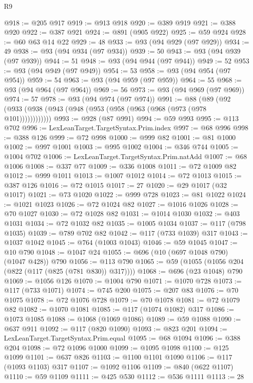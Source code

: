\begin{lexlean}{R9}
\begin{coremodule}
@918 := @205 @917
@919 := @913 @918
@920 := @389 @919
@921 := @388 @920
@922 := @387 @921
@924 := @891 (@905 @922)
@925 := @59 @924
@928 := @60 @63 @14 @22
@929 := 48
@933 := @93 (@94 @929 (@97 @929))
@934 := 49
@938 := @93 (@94 @934 (@97 @934))
@939 := 50
@943 := @93 (@94 @939 (@97 @939))
@944 := 51
@948 := @93 (@94 @944 (@97 @944))
@949 := 52
@953 := @93 (@94 @949 (@97 @949))
@954 := 53
@958 := @93 (@94 @954 (@97 @954))
@959 := 54
@963 := @93 (@94 @959 (@97 @959))
@964 := 55
@968 := @93 (@94 @964 (@97 @964))
@969 := 56
@973 := @93 (@94 @969 (@97 @969))
@974 := 57
@978 := @93 (@94 @974 (@97 @974))
@991 := @88 (@89 (@92 (@933 (@938 (@943 (@948 (@953 (@958 (@963 (@968 (@973 (@978 @101))))))))))))
@993 := @928 (@87 @991)
@994 := @59 @993
@995 := @113 @702
@996 := LexLeanTarget.TargetSyntax.Prim.index
@997 := @68 @996
@998 := @388 @126
@999 := @72 @998
@1000 := @999 @82
@1001 := @81 @1000
@1002 := @997 @1001
@1003 := @995 @1002
@1004 := @346 @744
@1005 := @1004 @702
@1006 := LexLeanTarget.TargetSyntax.Prim.natAdd
@1007 := @68 @1006
@1008 := @337 @77
@1009 := @336 @1008
@1011 := @72 @1009 @82
@1012 := @999 @1011
@1013 := @1007 @1012
@1014 := @72 @1013
@1015 := @387 @126
@1016 := @72 @1015
@1017 := 27
@1020 := @29 @1017 (@32 @1017)
@1021 := @73 @1020
@1022 := @999 @728
@1023 := @81 @1022
@1024 := @1021 @1023
@1026 := @72 @1024 @82
@1027 := @1016 @1026
@1028 := @70 @1027
@1030 := @72 @1028 @82
@1031 := @1014 @1030
@1032 := @403 @1031
@1034 := @72 @1032 @82
@1035 := @1005 @1034
@1037 := @117 (@798 @1035)
@1039 := @789 @702 @82
@1042 := @117 (@733 @1039) @317
@1043 := @1037 @1042
@1045 := @764 (@1003 @1043)
@1046 := @59 @1045
@1047 := @10 @790
@1048 := @1047 @24
@1055 := @696 (@10 (@697 @1048 @790) (@1047 @428)) @790
@1056 := @113 @790
@1065 := @59 (@1055 (@1056 @204 (@822 (@117 (@825 (@781 @830)) @317))))
@1068 := @696 (@23 @1048) @790
@1069 := @1056 @126
@1070 := @1004 @790
@1071 := @1070 @728
@1073 := @117 (@733 @1071)
@1074 := @745 @200
@1075 := @207 @83
@1076 := @70 @1075
@1078 := @72 @1076 @728
@1079 := @70 @1078
@1081 := @72 @1079 @82
@1082 := @1070 @1081
@1085 := @117 (@1074 @1082) @317
@1086 := @1073 @1085
@1088 := @1068 (@1069 @1086)
@1089 := @59 @1088
@1090 := @637 @911
@1092 := @117 (@820 @1090)
@1093 := @823 @201
@1094 := LexLeanTarget.TargetSyntax.Prim.equal
@1095 := @68 @1094
@1096 := @388 @204
@1098 := @72 @1096 @1000
@1099 := @1095 @1098
@1100 := @125 @1099
@1101 := @637 @826
@1103 := @1100 @1101 @1090
@1106 := @117 (@1093 @1103) @317
@1107 := @1092 @1106
@1109 := @840 (@622 @1107)
@1110 := @59 @1109
@1111 := @425 @530
@1112 := @536 @1111
@1113 := 28

\end{coremodule}
\end{lexlean}
